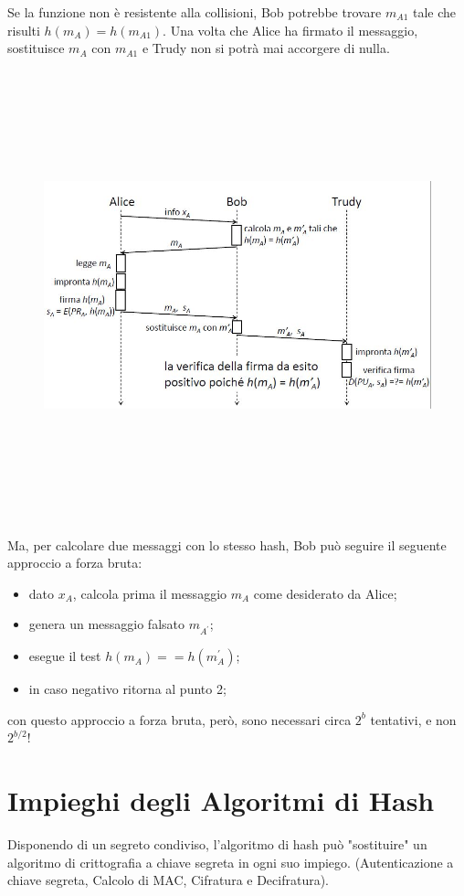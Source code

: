 Se la funzione non è resistente alla collisioni, Bob potrebbe trovare $m_{A1}$ tale che risulti $h(m_{A})= h(m_{A1})$.
Una volta che Alice ha firmato il messaggio, sostituisce $m_{A}$ con $m_{A1}$ e Trudy non si potrà mai accorgere di nulla.
\begin{figure}
	\begin{center}
	{\includegraphics[height=13cm, width=13cm, keepaspectratio]{Immagini/hash/schema_hash_collisioni_1.JPG}}
	\end{center}
\end{figure}
Ma, per calcolare due messaggi con lo stesso hash, Bob può seguire il seguente approccio a forza bruta:
\begin{itemize}
\item dato $x_{A}$, calcola prima il messaggio $m_{A}$ come desiderato da Alice;
\item genera un messaggio falsato $m_{A^{'}}$;
\item esegue il test $h(m_{A})==h(m_{A}^{'})$;
\item in caso negativo ritorna al punto 2;
\end{itemize}
con questo approccio a forza bruta, però, sono necessari circa $2^{b}$ tentativi, e non $2^{b/2}$!

\section{Impieghi degli Algoritmi di Hash}
Disponendo di un segreto condiviso, l'algoritmo di hash può "sostituire" un algoritmo di crittografia a chiave segreta in ogni suo impiego. (Autenticazione a chiave segreta, Calcolo di MAC, Cifratura e Decifratura).
